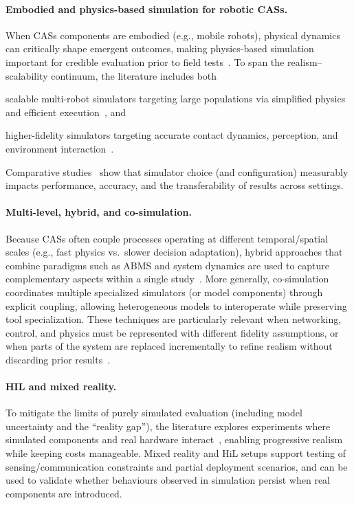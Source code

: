 \paragraph{Embodied and physics-based simulation for robotic \acp{CAS}.}
When \acp{CAS} components are embodied (e.g., mobile robots),
physical dynamics can critically shape emergent outcomes,
making physics-based simulation important for credible evaluation prior to field tests~\cite{DBLP:journals/swarm/BrambillaFBD13,DBLP:journals/computation/Calderon-ArceBS22}.
%
To span the realism--scalability continuum,
the literature includes both
\begin{inlinelist}
    \item scalable multi-robot simulators targeting large populations via simplified physics and efficient execution~\cite{DBLP:journals/swarm/PinciroliTOPBBMFCDBGD12}, and
     \item higher-fidelity simulators targeting accurate contact dynamics, perception, and environment interaction~\cite{DBLP:conf/iros/KoenigH04}.
\end{inlinelist}
%
Comparative studies~\cite{DBLP:journals/simpra/FarleyWM22,DBLP:journals/jirs/PlattR22}
show that simulator choice (and configuration) measurably impacts performance,
accuracy, and the transferability of results across settings.

\paragraph{Multi-level, hybrid, and co-simulation.}
Because \acp{CAS} often couple processes operating at different temporal/spatial scales
(e.g., fast physics vs.\ slower decision adaptation),
hybrid approaches that combine paradigms such as \ac{ABMS}
and system dynamics are used to capture complementary aspects within a single study~\cite{DBLP:journals/eor/NguyenHM24}.
%
More generally,
co-simulation~\cite{DBLP:journals/csur/GomesTBLV18} coordinates multiple specialized simulators (or model components) through explicit coupling,
allowing heterogeneous models to interoperate while preserving tool specialization.
%
These techniques are particularly relevant when networking, control,
and physics must be represented with different fidelity assumptions,
or when parts of the system are replaced incrementally to refine realism without discarding prior results~\cite{MittalRiscoMartin2017SimBasedCAS}.

\paragraph{\acl{HIL} and mixed reality.}
To mitigate the limits of purely simulated evaluation (including model uncertainty and the ``reality gap''),
the literature explores experiments where simulated components and real hardware interact~\cite{Sende2024},
enabling progressive realism while keeping costs manageable.
%
Mixed reality and \ac{HiL} setups support testing of sensing/communication constraints and partial deployment scenarios,
and can be used to validate whether behaviours observed in simulation persist when real components are introduced.

